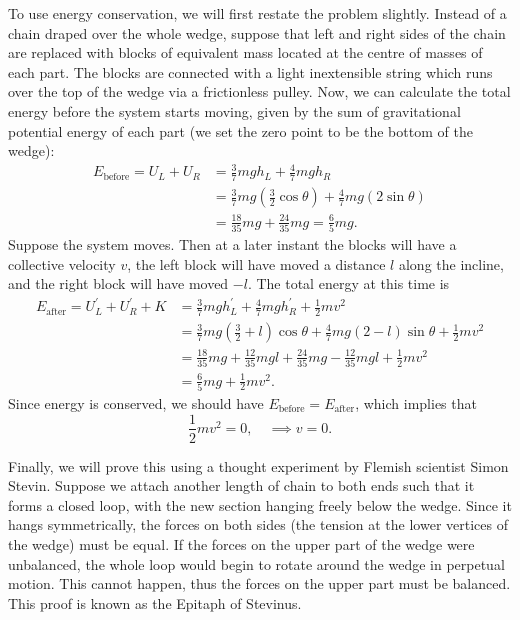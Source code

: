 \documentclass[../classical_mechanics.tex]{subfiles}
\begin{document}
\begin{example}
                To use energy conservation, we will first restate the problem slightly.
                Instead of a chain draped over the whole wedge, suppose that left and right sides of the chain are replaced with blocks of equivalent mass located at the centre of masses of each part.
                The blocks are connected with a light inextensible string which runs over the top of the wedge via a frictionless pulley.
                Now, we can calculate the total energy before the system starts moving, given by the sum of gravitational potential energy of each part (we set the zero point to be the bottom of the wedge):
                \begin{align}
                    E_\text{before}=U_L+U_R&=\frac{3}{7}mgh_L+\frac{4}{7}mgh_R\\
                    &=\frac{3}{7}mg(\frac{3}{2}\cos\theta)+\frac{4}{7}mg(2\sin\theta)\\
                    &=\frac{18}{35}mg+\frac{24}{35}mg=\frac{6}{5}mg.
                \end{align}
                Suppose the system moves.
                Then at a later instant the blocks will have a collective velocity $v$, the left block will have moved a distance $l$ along the incline, and the right block will have moved $-l$.
                The total energy at this time is
                \begin{align}
                    E_\text{after}=U_L^\prime+U_R^\prime+K&=\frac{3}{7}mgh_L^\prime+\frac{4}{7}mgh_R^\prime+\frac{1}{2}mv^2\\
                    &=\frac{3}{7}mg\left(\frac{3}{2}+l\right)\cos\theta+\frac{4}{7}mg(2-l)\sin\theta+\frac{1}{2}mv^2\\
                    &=\frac{18}{35}mg+\frac{12}{35}mgl+\frac{24}{35}mg-\frac{12}{35}mgl+\frac{1}{2}mv^2\\
                    &=\frac{6}{5}mg+\frac{1}{2}mv^2.
                \end{align}
                Since energy is conserved, we should have $E_\text{before}=E_\text{after}$, which implies that
                \begin{equation}
                    \frac{1}{2}mv^2=0,\quad\implies v=0.
                \end{equation}

                Finally, we will prove this using a thought experiment by Flemish scientist Simon Stevin.
                Suppose we attach another length of chain to both ends such that it forms a closed loop, with the new section hanging freely below the wedge.
                Since it hangs symmetrically, the forces on both sides (the tension at the lower vertices of the wedge) must be equal.
                If the forces on the upper part of the wedge were unbalanced, the whole loop would begin to rotate around the wedge in perpetual motion.
                This cannot happen, thus the forces on the upper part must be balanced.
                This proof is known as the Epitaph of Stevinus.
            \end{example}
\end{document}
